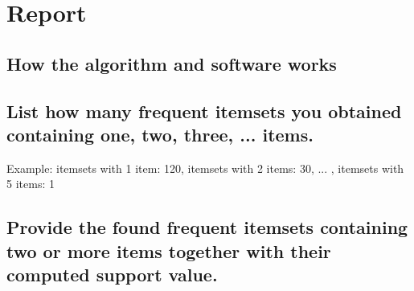 \documentclass[ngerman]{dis-template-add}
\begin{document}
\section*{Report}

\subsection*{How the algorithm and software works}
 
\subsection*{List how many frequent itemsets you obtained containing {one, two, three, ...} items.}Example: itemsets with 1 item: 120, itemsets with 2 items: 30, ... , itemsets with 5 items: 1
 
\subsection*{Provide the found frequent itemsets containing two or more items together with their computed support value.}
  
\end{document}
